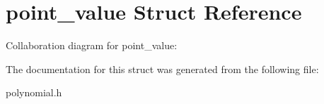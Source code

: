 \hypertarget{structpoint__value}{\section{point\-\_\-value Struct Reference}
\label{structpoint__value}
}


Collaboration diagram for point\-\_\-value\-:


The documentation for this struct was generated from the following file\-:\begin{DoxyCompactItemize}
\item 
polynomial.\-h\end{DoxyCompactItemize}
